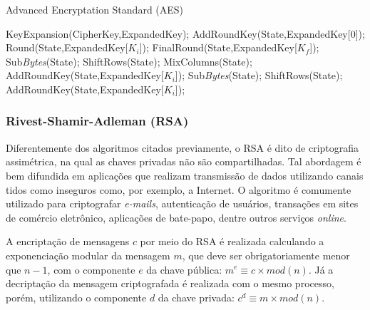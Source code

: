 \documentclass[12pt]{article}
\newcommand{\internet}{Internet\xspace}
\newcommand{\Bytes}{\textit{Bytes}\xspace}
\newcommand{\forin}{\textbf{em}}
\begin{document}
                \begin{algorithm} [H]
                \scriptsize
                \caption{Advanced Encryptation Standard (AES)}
                \label{alg:aes}
                \begin{algorithmic}[1]
                    \State KeyExpansion(CipherKey,ExpandedKey);
                    \State AddRoundKey(State,ExpandedKey[0]);
                    \For{keys $K_i$ \forin{} $CipherKey$}
                        \State Round(State,ExpandedKey[$K_i$]);
                    \EndFor
                    \State FinalRound(State,ExpandedKey[$K_f$]);
                \EndFunction
                \State
                    \State Sub\Bytes(State);
                    \State ShiftRows(State);
                    \State MixColumns(State);
                    \State AddRoundKey(State,ExpandedKey[$K_i$]);
                \EndFunction
                \State
                    \State Sub\Bytes(State);
                    \State ShiftRows(State);
                    \State AddRoundKey(State,ExpandedKey[$K_i$]);
                \EndFunction
                \end{algorithmic}
                \end{algorithm}
            
            \subsubsection{Rivest-Shamir-Adleman (RSA)}
            \label{subsubsec:rsa}
            
                Diferentemente dos algoritmos citados previamente, o RSA é dito de criptografia assimétrica, na qual as chaves privadas não são compartilhadas. Tal abordagem é bem difundida em aplicações que realizam transmissão de dados utilizando canais tidos como inseguros como, por exemplo, a \internet. O algoritmo é comumente utilizado para criptografar \textit{e-mails}, autenticação de usuários, transações em sites de comércio eletrônico, aplicações de bate-papo, dentre outros serviços \textit{online}.
                
                A encriptação de mensagens $c$ por meio do RSA é realizada calculando a exponenciação modular da mensagem $m$, que deve ser obrigatoriamente menor que $n-1$, com o componente $e$ da chave pública: $m^e \equiv c \times mod (n)$. Já a decriptação da mensagem criptografada é realizada com o mesmo processo, porém, utilizando o componente $d$ da chave privada: $c^d \equiv m \times mod (n)$.
                
\end{document}
